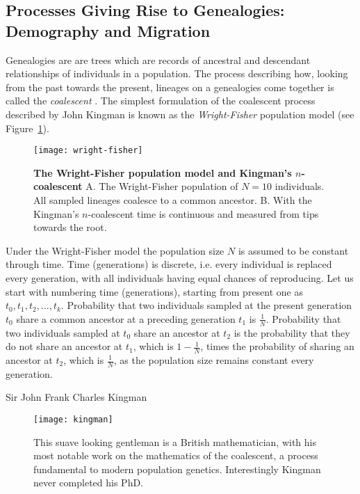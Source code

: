 \subsection{Processes Giving Rise to Genealogies: Demography and Migration\label{sub:molecular_clock}}

Genealogies are are trees which are records of ancestral and descendant relationships of individuals in a population.
The process describing how, looking from the past towards the present, lineages on a genealogies come together is called the \textit{coalescent} \citep{Kingman1982}.
The simplest formulation of the coalescent process described by John Kingman is known as the \textit{Wright-Fisher} \citep{Fisher1930,Wright1931} population model (see Figure~\ref{fig:wright-fisher}).

\begin{figure}[H]
\centering
\texttt{[image: wright-fisher]} 
\caption{
{ \footnotesize 
{\bf The Wright-Fisher population model and Kingman's $n$-coalescent} A. The Wright-Fisher population of $N=10$ individuals. All sampled lineages coalesce to a common ancestor.
B. With the Kingman's $n$-coalescent time is continuous and measured from tips towards the root.
}%
}
\label{fig:wright-fisher}
\end{figure}

Under the Wright-Fisher model the population size $N$ is assumed to be constant through time.
Time (generations) is discrete, i.e. every individual is replaced every generation, with all individuals having equal chances of reproducing.
Let us start with numbering time (generations), starting from present one as $t_{0},t_{1},t_{2},\ldots,t_{k}$.
Probability that two individuals sampled at the present generation $t_{0}$ share a common ancestor at a preceding generation $t_{1}$ is $\frac{1}{N}$.
Probability that two individuals sampled at $t_{0}$ share an ancestor at $t_{2}$ is the probability that they do not share an ancestor at $t_{1}$, which is $1-\frac{1}{N}$, times the probability of sharing an ancestor at $t_{2}$, which is $\frac{1}{N}$, as the population size remains constant every generation.

\begin{remark}{Sir John Frank Charles Kingman}
\begin{figure}[H]
\centering
\texttt{[image: kingman]} 
\caption{
{ \footnotesize 
This suave looking gentleman is a British mathematician, with his most notable work on the mathematics of the coalescent, a process fundamental to modern population genetics. 
Interestingly Kingman never completed his PhD.
}%
}
\label{fig:kingman}
\end{figure}
\end{remark}

